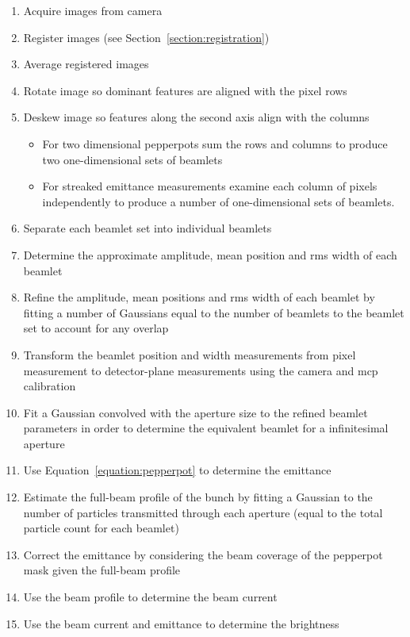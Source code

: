 \begin{enumerate}
    \item Acquire images from camera
    \item Register images (see Section~\ref{section:registration})
    \item Average registered images
    \item Rotate image so dominant features are aligned with the pixel rows
    \item Deskew image so features along the second axis align with the columns
    \begin{itemize}
        \item For two dimensional pepperpots sum the rows and columns to produce two one-dimensional sets of beamlets
        \item For streaked emittance measurements examine each column of pixels independently to produce a number of one-dimensional sets of beamlets.
    \end{itemize}
    \item Separate each beamlet set into individual beamlets
    \item Determine the approximate amplitude, mean position and \gls{rms} width of each beamlet
    \item Refine the amplitude, mean positions and \gls{rms} width of each beamlet by fitting a number of Gaussians equal to the number of beamlets to the beamlet set to account for any overlap
    \item Transform the beamlet position and width measurements from pixel measurement to detector-plane measurements using the camera and \gls{mcp} calibration
    \item Fit a Gaussian convolved with the aperture size to the refined beamlet parameters in order to determine the equivalent beamlet for a infinitesimal aperture
    \item Use Equation~\ref{equation:pepperpot} to determine the emittance
    \item Estimate the full-beam profile of the bunch by fitting a Gaussian to the number of particles transmitted through each aperture (equal to the total particle count for each beamlet)
    \item Correct the emittance by considering the beam coverage of the pepperpot mask given the full-beam profile
    \item Use the beam profile to determine the beam current
    \item Use the beam current and emittance to determine the brightness
\end{enumerate}


